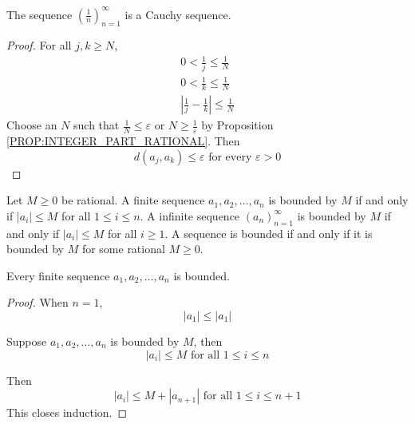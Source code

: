 \documentclass{blog}
\begin{document}
\begin{definition}
  The sequence $(\frac{1}{n})_{n = 1}^{\infty}$ is a Cauchy sequence.
\end{definition}

\begin{proof}
  For all $j, k \geq N$,
  \begin{gather*}
    0 < \frac{1}{j} \leq \frac{1}{N} \\
    0 < \frac{1}{k} \leq \frac{1}{N} \\
    \left| \frac{1}{j} - \frac{1}{k} \right| \leq \frac{1}{N}
  \end{gather*}
  Choose an $N$ such that $\frac{1}{N} \leq \varepsilon$
  or $N \geq \frac{1}{\varepsilon}$
  by Proposition \ref{PROP:INTEGER_PART_RATIONAL}.
  Then
  \begin{equation*}
    d(a_{j}, a_{k}) \leq \varepsilon \text{ for every } \varepsilon > 0
  \end{equation*}
\end{proof}

\begin{definition}
  Let $M \geq 0$ be rational.
  A finite sequence $a_{1}, a_{2}, \dots, a_{n}$ is bounded by $M$ if and only if
  $|a_{i}| \leq M$ for all $1 \leq i \leq n$.
  A infinite sequence $(a_{n})_{n = 1}^{\infty}$ is bounded by $M$ if and only if
  $|a_{i}| \leq M$ for all $i \geq 1$.
  A sequence is bounded if and only if it is bounded by $M$ for some rational $M \geq 0$.
\end{definition}

\begin{lemma}
  Every finite sequence $a_{1}, a_{2}, \dots, a_{n}$ is bounded.
\end{lemma}

\begin{proof}
  When $n = 1$,
  \begin{equation*}
    |a_{1}| \leq |a_{1}|
  \end{equation*}

  Suppose $a_{1}, a_{2}, \dots, a_{n}$ is bounded by $M$, then
  \begin{equation*}
    |a_{i}| \leq M \text{ for all } 1 \leq i \leq n
  \end{equation*}

  Then
  \begin{equation*}
    |a_{i}| \leq M + |a_{n + 1}| \text{ for all } 1 \leq i \leq n + 1
  \end{equation*}
  This closes induction.
\end{proof}
\end{document}
